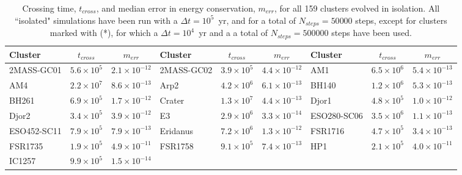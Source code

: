         \begin{table}
        \caption[Crossing and time, time step, and energy conservation for each Globular cluster]{Crossing time, $t_{cross}$, and median error in energy conservation, $m_{err}$, for all 159 clusters evolved in isolation. All ``isolated" simulations have been run with a $\Delta t=10^5$~yr, and for a total of $N_{steps}=50 000$ steps, except for clusters marked with (*), for which a $\Delta t=10^4$~yr and a a total of $N_{steps}=500 000$ steps have been used. }\label{tcross-energy}
        \tiny
        \begin{center}
        \begin{tabular}{l | c | c | l |  c|   c | l | c | c } 
        \hline
                Cluster &       $ t_{cross}$ &  $m_{err}$ & Cluster &       $ t_{cross}$ &  $m_{err}$  & Cluster &       $ t_{cross}$ &  $m_{err}$ \\
                \hline \hline
            2MASS-GC01 & $5.6\times10^5$ &         $ 2.1\times10^{-12}$  &
            2MASS-GC02 &  $3.9\times10^5$ &          $4.4\times10^{-12}$ &
                AM1 &  $6.5\times10^6$ &          $5.4\times10^{-13}$ \\
                AM4 &  $2.2\times10^7$ &          $8.6\times10^{-13}$ & 
                Arp2 &  $4.2\times10^6$ &          $6.1\times10^{-13}$ &  
                BH140 &  $1.2\times10^6$ &         $ 5.3\times10^{-13}$  \\
                BH261 &  $6.9\times10^5$ &          $1.7\times10^{-12}$  &
                Crater &  $1.3\times10^7$ &         $ 4.4\times10^{-13}$ &
                Djor1 &  $4.8\times10^5$ &          $1.0\times10^{-12}$  \\
                Djor2 &  $3.4\times10^5$ &          $3.9\times10^{-12}$ &
                    E3 &  $2.9\times10^6$ &          $3.3\times10^{-14}$  &
        ESO280-SC06 &  $3.5\times10^6$ &         $ 1.1\times10^{-13}$  \\
        ESO452-SC11 &  $7.9\times10^5$ &          $7.9\times10^{-13}$  &
            Eridanus &  $7.2\times10^6$ &          $1.3\times10^{-12}$ &
            FSR1716 &  $4.7\times10^5$ &         $ 3.4\times10^{-13}$  \\
            FSR1735 &  $1.9\times10^5$ &          $4.9\times10^{-11}$ &
            FSR1758 &  $9.1\times10^5$ &          $7.4\times10^{-13}$  &
                HP1 &  $2.1\times10^5$ &          $4.0\times10^{-11}$  \\
                IC1257 &  $9.9\times10^5$ &         $ 1.5\times10^{-14}$ &

\end{tabular}
\end{center}
\end{table}
